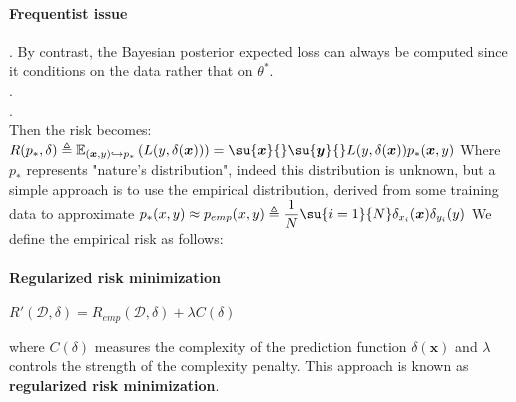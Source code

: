\paragraph{Frequentist issue}
. By contrast, the Bayesian posterior expected loss can always be computed 
since it conditions on the data rather that on $\theta^{*}$.\\
.\\
.\\
Then the risk becomes:
$R(p_{*}, \delta) \triangleq \mathbb{E}_{(\bm{x}, y)\hookrightarrow p_{*}}\left(L(y,
\delta(\bm{x}))\right) = \su{\bm{x}}{}\su{\bm{y}}{}L(y, \delta(\bm{x}))p_{*}(\bm{x}, y)$
Where $p_{*}$ represents "nature's distribution", indeed this distribution is unknown, 
but a simple approach is to use the empirical distribution, derived from some training 
data to approximate $p_{*}(x,y)\approx
p_{emp}(x,y) \triangleq \dfrac{1}{N}\su{i=1}{N}\delta_{x_{i}}(\bm{x})\delta_{y_{i}}(y)$
We define the empirical risk as follows:


\paragraph{Regularized risk minimization}
\begin{center}
    $R'(\mathcal{D}, \delta) = R_{emp}(\mathcal{D}, \delta) + \lambda C(\delta)$
\end{center}
where $C(\delta)$ measures the complexity of the prediction function $\delta(\bm{x})$ and 
$\lambda$ controls the strength of the complexity penalty. 
This approach is known as \textbf{regularized risk minimization}.
